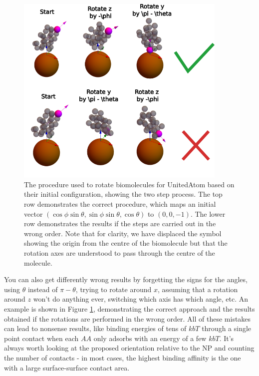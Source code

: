 \documentclass[10pt,a4paper,onecolumn]{report}
\begin{document}
\begin{figure} \label{fig:rotation_pathway}
    \centering
    \includegraphics[width=0.9\textwidth]{figures/rotation_pathway.png}
    \caption{The procedure used to rotate biomolecules for UnitedAtom based on their initial configuration, showing the two step process. The top row demonstrates the correct procedure, which maps an initial vector $(\cos \phi \sin \theta, \sin \phi \sin \theta, \cos \theta)$ to $(0,0,-1)$. The lower row demonstrates the results if the steps are carried out in the wrong order. Note that for clarity, we have displaced the symbol showing the origin from the centre of the biomolecule but that the rotation axes are understood to pass through the centre of the molecule.  }
\end{figure}



You can also get differently wrong results by forgetting the signs for the angles, using $\theta$ instead of $\pi - \theta$, trying to rotate around $x$, assuming that a rotation around $z$ won't do anything ever, switching which axis has which angle, etc. An example is shown in Figure \ref{fig:rotation_pathway}, demonstrating the correct approach and the results obtained if the rotations are performed in the wrong order. All of these mistakes can lead to nonsense results, like binding energies of tens of $kbT$ through a single point contact when each $AA$ only adsorbs with an energy of a few $kbT$. It's always worth looking at the proposed orientation relative to the NP and counting the number of contacts - in most cases, the highest binding affinity is the one with a large surface-surface contact area.
\end{document}
